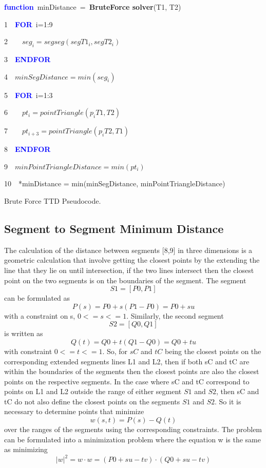 \documentclass[times,12pt]{ACME2015article}
\newenvironment{lyxcode}
{\par\begin{list}{}{
\setlength{\rightmargin}{\leftmargin}
\setlength{\listparindent}{0pt}%
\raggedright
\setlength{\itemsep}{0pt}
\setlength{\parsep}{0pt}
\normalfont\ttfamily}%
 \item[]}
{\end{list}}
\begin{document}
\begin{algorithm}
\begin{lyxcode}
\textbf{\textcolor{blue}{function}}~minDistance~=~\textbf{BruteForce solver}(T1, T2)

1~~\textbf{\textcolor{blue}{FOR}}~i=1:9

2~~~~$seg_{i} =segseg(segT1_{i}, segT2_{i})$

3~~\textbf{\textcolor{blue}{ENDFOR}}

4~~$minSegDistance = min(seg_{i})$

5~~\textbf{\textcolor{blue}{FOR}}~i=1:3

6~~~~$pt_{i} = pointTriangle(p_iT1, T2)$

7~~~~$pt_{i+3} = pointTriangle(p_iT2, T1)$

8~~\textbf{\textcolor{blue}{ENDFOR}}

9~~$minPointTriangleDistance = min(pt_{i})$

10~~*minDistance = min(minSegDistance, minPointTriangleDistance)

\end{lyxcode}
\protect\caption{\label{alg4}Brute Force TTD Pseudocode.}
\end{algorithm}


\subsection{Segment to Segment Minimum Distance }
The calculation of the distance between segments [8,9] in three dimensions is a geometric calculation that involve getting the closest points by the extending the line that they lie on until intersection, if the two lines intersect then the closest point on the two segments is on the boundaries of the segment.
The segment 
$$S1 = [P0, P1]$$
can be formulated as 
$$P(s) = P0+s(P1-P0) = P0+su$$
with a constraint on s, $0<=s<=1$. Similarly, the second segment 
$$S2 = [Q0, Q1]$$
is written as $$Q(t) = Q0+t(Q1-Q0) = Q0+tu$$ with constraint $0<=t<=1$. So, for $sC$ and $tC$ being the closest points on the corresponding extended segments lines L1 and L2, then if  both sC and tC are within the boundaries of the segments then the closest points are also the closest points on the respective segments. 
In the case where sC and tC correspond to points on L1 and L2 outside the range of either segment $S1$ and $S2$, then sC and tC do not also define the closest points on the segments $S1$ and $S2$. So it is necessary to determine points that minimize 
\begin{equation}
w(s,t) = P(s) - Q(t)
\end{equation}
over the ranges of the segments using the corresponding constraints. 
The problem can be formulated into a minimization problem where the equation w is the same as minimizing 
$$|w|^2 = w \cdot w= (P0+su-tv) \cdot (Q0+su-tv)$$
\end{document}
